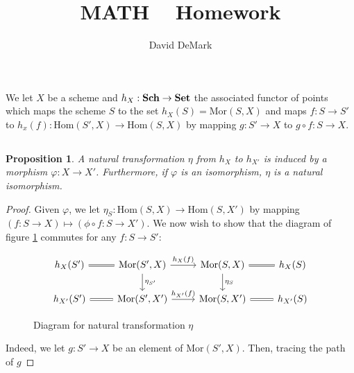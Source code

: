 \documentclass[english,letter,doublesided]{article}
\title{MATH \course~ Homework \Roman{hwn}}
\author{David DeMark}
\date{\due}
\newcommand{\mor}{\mathrm{Mor}}
\newcommand{\prob}[1]{\setcounter{section}{#1-1}\section{}}
\newcommand{\prt}[1]{\setcounter{subsection}{#1-1}\subsection{}}
\newtheorem*{prop*}{Proposition}
\theoremstyle{remark}
\theoremstyle{definition}
\renewcommand{\hom}{\mathrm{Hom}}
\newcommand{\cat}[1]{{\mathrm{\bf{#1}}}}
\newcommand{\gph}{\varphi}
\begin{document}
\maketitle

\prob{1} We let $X$ be a scheme and $h_X:\cat{Sch}\to \cat{Set}$ the associated functor of points which maps the scheme $S$ to the set $h_X(S)=\mor(S,X)$ and maps $f:S\to S'$ to $h_x(f):\hom(S',X)\to \hom(S,X)$ by mapping $g:S'\to X$ to $g\circ f:S\to X$. 
\prt{1}
\begin{prop*}
	A natural transformation $\eta$ from $h_X$ to $ h_{X'}$ is induced by a morphism $\gph:X\to X'$. Furthermore, if $\gph$ is an isomorphism, $\eta$ is a natural isomorphism. 
\end{prop*}
\begin{proof}
Given $\gph$, we let $\eta_S:\hom(S,X)\to \hom(S,X')$ by mapping $(f:S\to X)\mapsto (\phi\circ f:S\to X')$. We now wish to show that the diagram of figure \ref{ntdiag} commutes for any $f:S\to S':$
\begin{figure}[h!]
	$$\begin{tikzcd}
	h_X(S')\arrow[r,equal]&\mor(S',X)\arrow[r,"h_X(f)"]\arrow[d,"\eta_{S'}"]&\mor(S,X)\arrow[d,"\eta_S"]\arrow[r,equal]&h_X(S)\\
	h_{X'}(S')\arrow[r,equal]&\mor(S',X')\arrow[r,"h_{X'}(f)"]&\mor(S,X')\arrow[r,equal]&h_{X'}(S)
	\end{tikzcd}$$\caption{Diagram for natural transformation $\eta$\label{ntdiag}}
\end{figure}
Indeed, we let $g:S'\to X$ be an element of $\mor(S',X)$. Then, tracing the path of $g$
\end{proof}
\prt{2}
\end{document}
